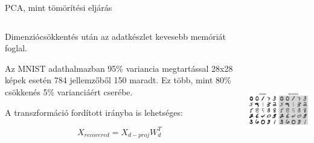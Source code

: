 \documentclass[english, aspectratio=169]{beamer}
\begin{document}
\begin{frame}{PCA, mint tömörítési eljárás}
\begin{columns}
\begin{column}{.5\textwidth}
Dimenziócsökkentés után az adatkészlet kevesebb memóriát foglal.\par\smallskip
Az MNIST adathalmazban 95\% variancia megtartással 28x28 képek esetén 784 jellemzőből 150 maradt. Ez több, mint 80\% csökkenés 5\% varianciáért cserébe.\par\smallskip
A transzformáció fordított irányba is lehetséges:
\begin{block}{}
\vspace{-.2cm}
\[
X_{recovered} = X_{d-proj} W_d^T
\]
\end{block}
\end{column}
\begin{column}{.5\textwidth}
\begin{center}
\includegraphics[width=7cm, height=7cm, keepaspectratio]{images/unsupervised_15.png}
\end{center}
\end{column}
\end{columns}
\end{frame}
\end{document}
